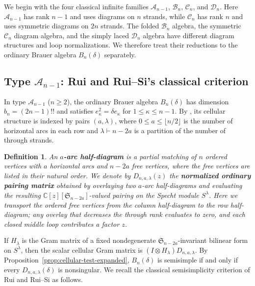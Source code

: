 \documentclass[11pt,a4paper]{amsart}
\theoremstyle{uprightdefinition}
\newtheorem{definition}[theorem]{Definition}
\theoremstyle{remark}\newtheorem{remark}[theorem]{Remark}
\begin{document}
We begin with the four classical infinite families $\mathscr{A}_{n-1}$, $\mathscr{B}_n$, $\mathscr{C}_n$, and $\mathscr{D}_n$.
Here $\mathscr{A}_{n-1}$ has rank $n-1$ and uses diagrams on $n$ strands, while
$\mathscr{C}_n$ has rank $n$ and uses symmetric diagrams on $2n$ strands.
The folded $\mathscr{B}_n$ algebra, the symmetric $\mathscr{C}_n$ diagram algebra, and the
simply laced $\mathscr{D}_n$ algebra have different diagram structures and loop normalizations.
We therefore treat their reductions to the ordinary Brauer algebra
$B_n(\delta)$ separately.

\subsection{Type \texorpdfstring{$\mathscr{A}_{n-1}$}{A(n-1)}: Rui and Rui--Si's classical criterion}
\label{subsec:type-A}

In type $\mathscr{A}_{n-1}$ ($n\ge2$), the ordinary Brauer algebra $B_n(\delta)$ has
dimension $b_n=(2n-1)!!$ and satisfies $e_{\kappa}^2=\delta e_{\kappa}$ for $1\le \kappa\le n-1$.
By \cite[Definition~4.9 and Theorem~4.10]{GL1996}, its cellular structure
is indexed by pairs $(a,\lambda)$, where
$0\le a\le \lfloor n/2\rfloor$ is the number of horizontal arcs in each row and
$\lambda\vdash n-2a$ is a partition of the number of through strands.

\begin{definition}\label{def:ordinary-pairing}
An \textbf{$a$-arc half-diagram} is a partial matching of $n$ ordered
vertices with $a$ horizontal arcs and $n-2a$ free vertices, where the free vertices are listed in
their natural order. We denote by $D_{n,a,\lambda}(z)$ the
\textbf{normalized ordinary pairing matrix}
obtained by overlaying two $a$-arc half-diagrams and evaluating the
resulting $\mathbb C[z][\mathfrak S_{n-2a}]$-valued pairing on the Specht module $S^\lambda$.
Here we transport the ordered free vertices from the column half-diagram to the row half-diagram; any overlay that decreases the
through rank evaluates to zero, and each closed middle loop contributes a factor $z$.
\end{definition}

If $H_\lambda$ is the Gram matrix of a fixed nondegenerate $\mathfrak S_{n-2a}$-invariant bilinear form on $S^\lambda$,
then the scalar cellular Gram matrix is $(I\otimes H_\lambda)D_{n,a,\lambda}$.
By Proposition~\ref{prop:cellular-test-expanded}, $B_n(\delta)$ is semisimple if and only if
every $D_{n,a,\lambda}(\delta)$ is nonsingular. We recall the classical semisimplicity criterion of Rui and Rui--Si as follows.
\end{document}
